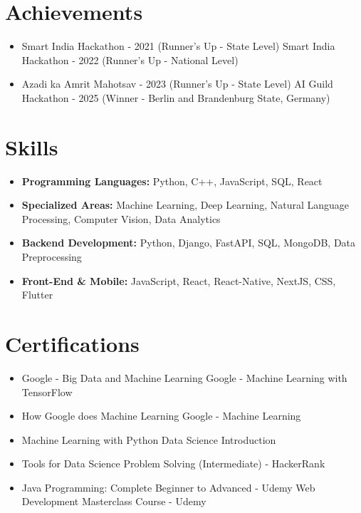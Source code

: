\documentclass[a4paper,10pt]{article}
\begin{document}
\section*{Achievements}
\begin{itemize}
\item Smart India Hackathon - 2021 (Runner's Up - State Level) \hfill Smart India Hackathon - 2022 (Runner's Up - National Level)
\item Azadi ka Amrit Mahotsav - 2023 (Runner's Up - State Level) \hfill AI Guild Hackathon - 2025 (Winner - Berlin and Brandenburg State, Germany)
\end{itemize}

\section*{Skills}
\begin{itemize}
  \item \textbf{Programming Languages:} Python, C++, JavaScript, SQL, React
  \item \textbf{Specialized Areas:} Machine Learning, Deep Learning, Natural Language Processing, Computer Vision, Data Analytics
  \item \textbf{Backend Development:} Python, Django, FastAPI, SQL, MongoDB, Data Preprocessing
  \item \textbf{Front-End \& Mobile:} JavaScript, React, React-Native, NextJS, CSS, Flutter
\end{itemize}

\section*{Certifications}
\begin{itemize}
\item Google - Big Data and Machine Learning \hfill Google - Machine Learning with TensorFlow
\item How Google does Machine Learning \hfill Google - Machine Learning
\item Machine Learning with Python \hfill Data Science Introduction
\item Tools for Data Science \hfill Problem Solving (Intermediate) - HackerRank
\item Java Programming: Complete Beginner to Advanced - Udemy \hfill Web Development Masterclass Course - Udemy
\end{itemize}
\end{document}
